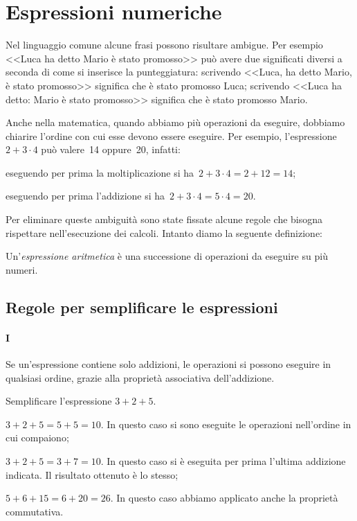 \ovalbox{\risolvii \ref{ese:1.21}, \ref{ese:1.22}, \ref{ese:1.23}, \ref{ese:1.24}, \ref{ese:1.25}, \ref{ese:1.26}}

\section{Espressioni numeriche}
Nel linguaggio comune alcune frasi possono risultare ambigue. Per esempio
<<Luca ha detto Mario è stato promosso>> può avere due significati diversi
a seconda di come si inserisce la punteggiatura:
scrivendo <<Luca, ha detto Mario, è stato promosso>> significa che è stato promosso Luca;
scrivendo <<Luca ha detto: Mario è stato promosso>> significa che è stato promosso Mario.

Anche nella matematica, quando abbiamo più operazioni da eseguire, dobbiamo chiarire l'ordine con
cui esse devono essere eseguire. Per esempio, l'espressione~$2+3\cdot 4$ può valere~14 oppure~20, infatti:
\begin{itemize*}
 \item eseguendo per prima la moltiplicazione si ha~$2+3\cdot 4=2+12=14$;
 \item eseguendo per prima l'addizione si ha~$2+3\cdot 4=5\cdot 4=20$.
\end{itemize*}

Per eliminare queste ambiguità sono state fissate alcune regole che bisogna rispettare
nell'esecuzione dei calcoli. Intanto diamo la seguente definizione:

\begin{definizione}
 Un'\emph{espressione aritmetica} è una successione di operazioni da eseguire su più numeri.
\end{definizione}

\subsection{Regole per semplificare le espressioni}
\paragraph {I} Se un'espressione contiene solo addizioni, le operazioni si possono eseguire
in qualsiasi ordine, grazie alla proprietà associativa dell'addizione.
\begin{exrig}
 \begin{esempio}
 Semplificare l'espressione $3+2+5$.
\begin{itemize*}
 \item $3+2+5=5+5=10$. In questo caso si sono eseguite le operazioni nell'ordine in cui compaiono;
 \item $3+2+5=3+7=10$. In questo caso si è eseguita per prima l'ultima addizione indicata. Il risultato ottenuto è lo stesso;
 \item $5+6+15=6+20=26$. In questo caso abbiamo applicato anche la proprietà commutativa.
\end{itemize*}
 \end{esempio}
\end{exrig}


